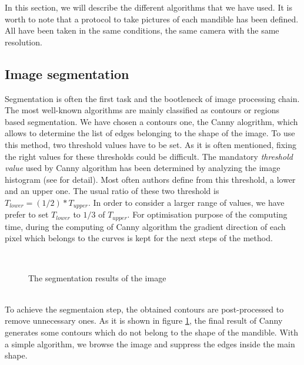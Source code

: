 \documentclass[twoside,twocolumn,10pt]{article}
\begin{document}
In this section, we will describe the different algorithms that we have
used. It is worth to note that a protocol to take pictures of each mandible has
been defined. All have been taken in the same conditions, the same
camera with the same resolution.
\subsection{Image segmentation}
Segmentation is often the first task and the bootleneck of image processing
chain. The most well-known algorithms are mainly classified as contours
or regions based segmentation. We have chosen a contours one, the
Canny alogrithm\cite{canny1986computational}, which allows to determine the 
list of edges belonging to the shape of the image.
To use this method, two threshold values have to be set. As it is often mentioned, fixing the right values for these thresholds could be difficult\cite{adaptiveCanny}. The mandatory \textit{threshold
  value} used by Canny algorithm has been determined by analyzing the image
histogram (see \cite{leestimating} for detail). Most often authors define from this threshold, a lower and an upper one. The usual ratio of these two threshold is $T_{lower} = (1/2) * T_{upper}$. In order to consider a larger range of values, we have prefer to set $T_{lower}$ to $1/3$ of $T_{upper}$. For optimisation purpose of the computing time, 
during the computing of Canny algorithm the gradient direction of each pixel which belongs to the
curves is kept for the next steps of the method.\\
\begin{figure}[h]
\centering
{}~~ 
\caption{The segmentation results of the image}
\label{canny}
\end{figure}~\\
To achieve the segmentaion step, the obtained contours are post-processed to remove unnecessary
ones. As it is shown in figure \ref{canny}, the final result of Canny generates some contours which do not belong to the shape of the mandible. With a simple algorithm, we browse the image and suppress the edges inside the main shape.
\end{document}
